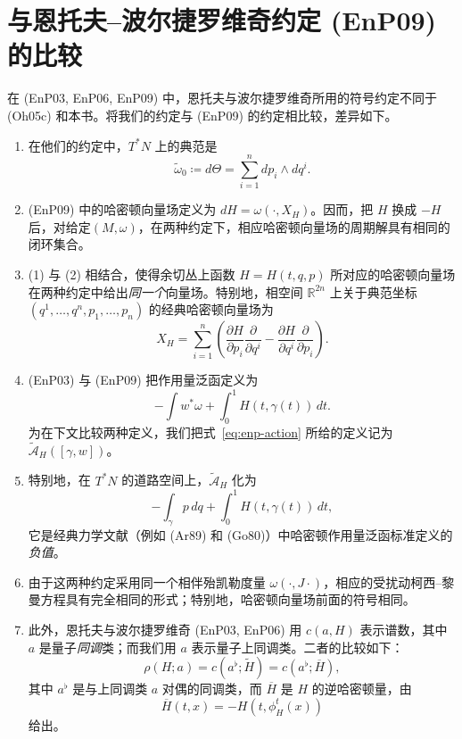 \section*{与恩托夫--波尔捷罗维奇约定 (EnP09) 的比较}

在 (EnP03, EnP06, EnP09) 中，恩托夫与波尔捷罗维奇所用的符号约定不同于 (Oh05c) 和本书。将我们的约定与 (EnP09) 的约定相比较，差异如下。

\begin{enumerate}[label=(\arabic*)]
  \item 在他们的约定中，$T^*N$ 上的典范\termSymplecticForm{}是
  \[
    \widetilde\omega_0\coloneqq d\Theta=\sum_{i=1}^n dp_i\wedge dq^i.
  \]

  \item (EnP09) 中的哈密顿向量场定义为 $dH=\omega(\cdot,X_H)$。因而，把 $H$ 换成 $-H$ 后，对给定\termSymplecticManifold $(M,\omega)$，在两种约定下，相应哈密顿向量场的周期解具有相同的闭环集合。

  \item (1) 与 (2) 相结合，使得余切丛上函数 $H=H(t,q,p)$ 所对应的哈密顿向量场在两种约定中给出\emph{同一个}向量场。特别地，相空间 $\mathbb R^{2n}$ 上关于典范坐标 $(q^1,\ldots,q^n,p_1,\ldots,p_n)$ 的经典哈密顿向量场为
  \[
    X_H=\sum_{i=1}^n\left(
      \frac{\partial H}{\partial p_i}\frac{\partial}{\partial q^i}
      -\frac{\partial H}{\partial q^i}\frac{\partial}{\partial p_i}
    \right).
  \]

  \item (EnP03) 与 (EnP09) 把作用量泛函定义为
  \begin{equation}\tag{0.0.1}\label{eq:enp-action}
    -\int w^*\omega+\int_0^1 H(t,\gamma(t))\,dt.
  \end{equation}
  为在下文比较两种定义，我们把式~\eqref{eq:enp-action} 所给的定义记为 $\widetilde{\mathcal A}_H([\gamma,w])$。

  \item 特别地，在 $T^*N$ 的道路空间上，$\widetilde{\mathcal A}_H$ 化为
  \[
    -\int_\gamma p\,dq+\int_0^1 H(t,\gamma(t))\,dt,
  \]
  它是经典力学文献（例如 (Ar89) 和 (Go80)）中哈密顿作用量泛函标准定义的\emph{负值}。

  \item 由于这两种约定采用同一个相伴殆凯勒度量 $\omega(\cdot,J\cdot)$，相应的受扰动柯西--黎曼方程具有完全相同的形式；特别地，哈密顿向量场前面的符号相同。

  \item 此外，恩托夫与波尔捷罗维奇 (EnP03, EnP06) 用 $c(a,H)$ 表示谱数，其中 $a$ 是量子\emph{同调}类；而我们用 $a$ 表示量子上同调类。二者的比较如下：
  \begin{equation}\tag{0.0.2}\label{eq:enp-spectral-comparison}
    \rho(H;a)=c(a^\flat;\widetilde H)=c(a^\flat;\overline H),
  \end{equation}
  其中 $a^\flat$ 是与上同调类 $a$ 对偶的同调类，而 $\overline H$ 是 $H$ 的逆哈密顿量，由
  \begin{equation}\tag{0.0.3}\label{eq:inverse-hamiltonian}
    \overline H(t,x)=-H(t,\phi_H^t(x))
  \end{equation}
  给出。


\end{enumerate}
